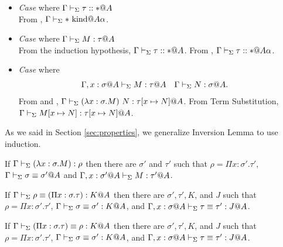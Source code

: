 \begin{itemize}
	\item \textit{Case} \KCsp{} where \(\Gamma\vdash_\Sigma \tau::* @A\) \\
	      From \WStar, \(\Gamma\vdash_\Sigma *\text{\ kind} @A\alpha\).
	      	  
	\item \textit{Case} \TCsp{} where \( \G\V M:\tau@A \) \\
	      From the induction hypothesis, \( \Gamma \vdash_\Sigma \tau :: * @ A \).
	      From \KCsp, \( \Gamma \vdash_\Sigma \tau :: * @ A\alpha \).
	      
	\item \textit{Case} \QBeta{} where
	      \begin{align*} 
	      	  & \G,x:\sigma@A\V M:\tau@A &   & \G\V N:\sigma@A. 
	      \end{align*}
	      From \TAbs{} and \TApp, \( \Gamma\vdash_\Sigma(\lambda x:\sigma.M)\ N : \tau[x \mapsto N]@A \).
	      From Term Substitution, \( \Gamma\vdash_\Sigma M[x\mapsto N] : \tau[x \mapsto N]@A \).
\end{itemize}

As we said in Section \ref{sec:properties}, we generalize Inversion Lemma to use induction.
\begin{lemma}
	\item If $\Gamma \vdash_\Sigma (\lambda x:\sigma.M) : \rho$ then there are $\sigma'$ and $\tau'$ such that
	$\rho = \Pi x:\sigma'.\tau'$, $\Gamma \vdash_\Sigma \sigma \equiv \sigma'@A$ and $\Gamma ,x:\sigma'@A\vdash_\Sigma M:\tau'@A$.
	\item If $\Gamma \vdash_\Sigma \rho \equiv (\Pi x:\sigma.\tau) : K @A$ then there are $\sigma', \tau', K$, and $J$ such that
	$\rho = \Pi x:\sigma'.\tau'$, $\Gamma \vdash_\Sigma \sigma \equiv \sigma' : K @A$, and $\G, x:\sigma@A\V \tau \E \tau' : J @A$.
	\item If $\Gamma \vdash_\Sigma (\Pi x:\sigma.\tau) \equiv \rho : K @A$ then there are $\sigma', \tau', K$, and $J$ such that
	$\rho = \Pi x:\sigma'.\tau'$, $\Gamma \vdash_\Sigma \sigma \equiv \sigma' : K @A$, and $\G, x:\sigma@A\V \tau \E \tau' : J @A$.
\end{lemma}

